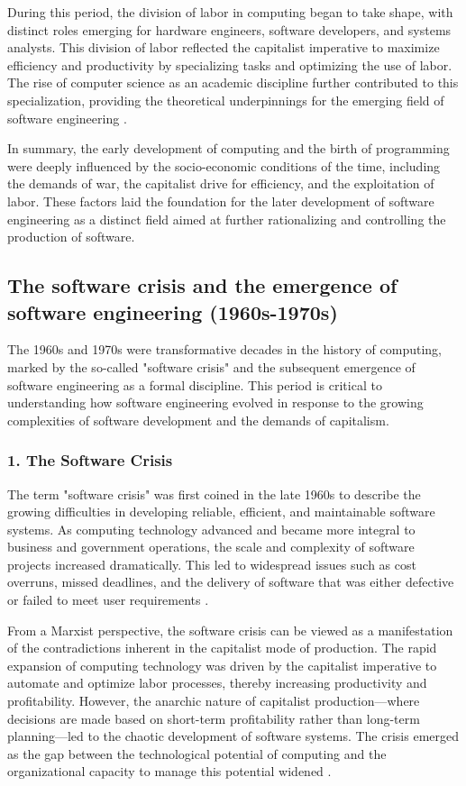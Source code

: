 \begin{refsection}
\begin{multicols}{2}
{During this period, the division of labor in computing began to take shape, with distinct roles emerging for hardware engineers, software developers, and systems analysts. This division of labor reflected the capitalist imperative to maximize efficiency and productivity by specializing tasks and optimizing the use of labor. The rise of computer science as an academic discipline further contributed to this specialization, providing the theoretical underpinnings for the emerging field of software engineering \cite{ceruzzi2003history}.

In summary, the early development of computing and the birth of programming were deeply influenced by the socio-economic conditions of the time, including the demands of war, the capitalist drive for efficiency, and the exploitation of labor. These factors laid the foundation for the later development of software engineering as a distinct field aimed at further rationalizing and controlling the production of software.

}
\subsection{The software crisis and the emergence of software engineering (1960s-1970s)}
{\small
The 1960s and 1970s were transformative decades in the history of computing, marked by the so-called "software crisis" and the subsequent emergence of software engineering as a formal discipline. This period is critical to understanding how software engineering evolved in response to the growing complexities of software development and the demands of capitalism.

\subsubsection*{1. The Software Crisis}

The term "software crisis" was first coined in the late 1960s to describe the growing difficulties in developing reliable, efficient, and maintainable software systems. As computing technology advanced and became more integral to business and government operations, the scale and complexity of software projects increased dramatically. This led to widespread issues such as cost overruns, missed deadlines, and the delivery of software that was either defective or failed to meet user requirements \cite{nato1969software}.

From a Marxist perspective, the software crisis can be viewed as a manifestation of the contradictions inherent in the capitalist mode of production. The rapid expansion of computing technology was driven by the capitalist imperative to automate and optimize labor processes, thereby increasing productivity and profitability. However, the anarchic nature of capitalist production—where decisions are made based on short-term profitability rather than long-term planning—led to the chaotic development of software systems. The crisis emerged as the gap between the technological potential of computing and the organizational capacity to manage this potential widened \cite{braverman1974labor}.

}
\end{multicols}
\end{refsection}

